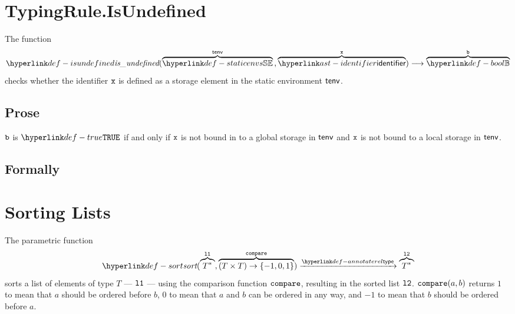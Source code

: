 \section{TypingRule.IsUndefined \label{sec:TypingRule.IsUndefined}}
\hypertarget{def-isundefined}{}
The function
\[
\isundefined(\overname{\staticenvs}{\tenv} \aslsep \overname{\identifier}{\vx})
\aslto \overname{\Bool}{\vb}
\]
checks whether the identifier $\vx$ is defined as a storage element in the static environment $\tenv$.

\subsection{Prose}
$\vb$ is $\True$ if and only if $\vx$ is not bound in to a global storage in $\tenv$ and
$\vx$ is not bound to a local storage in $\tenv$.

\subsection{Formally}
\begin{mathpar}
\end{mathpar}

\section{Sorting Lists \label{sec:sortinglists}}
\hypertarget{def-sort}{}
The parametric function
\[
\sort(\overname{T^*}{\vlone}, \overname{(T\times T)\rightarrow \{-1,0,1\}}{\compare}) \typearrow \overname{T^*}{\vltwo}
\]
sorts a list of elements of type $T$ --- $\vlone$ --- using the comparison function $\compare$,
resulting in the sorted list $\vltwo$.
$\compare(a, b)$ returns $1$ to mean that $a$ should be ordered before $b$,
$0$ to mean that $a$ and $b$ can be ordered in any way,
and $-1$ to mean that $b$ should be ordered before $a$.

